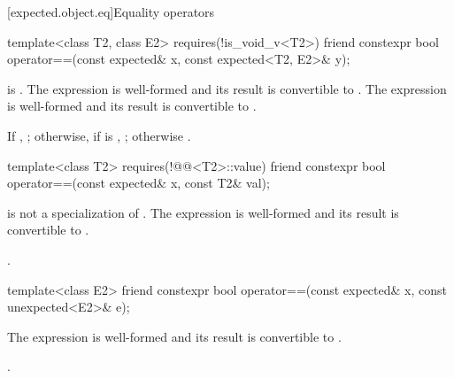 [expected.object.eq]{Equality operators}

%
\begin{itemdecl}
template<class T2, class E2>
  requires(!is_void_v<T2>)
friend constexpr bool operator==(const expected& x, const expected<T2, E2>& y);
\end{itemdecl}

\begin{itemdescr}
\pnum
\mandates
{} is . The expression  is well-formed and its result is convertible to . The expression  is well-formed and its result is convertible to .

\pnum
\returns
If , ; otherwise, if  is , ; otherwise .
\end{itemdescr}

%
\begin{itemdecl}
template<class T2>
  requires(!@@<T2>::value)
friend constexpr bool operator==(const expected& x, const T2& val);
\end{itemdecl}

\begin{itemdescr}
\pnum
\mandates
{} is not a specialization of . The expression  is well-formed and its result is convertible to .

\pnum
\returns
{}.
\end{itemdescr}

%
\begin{itemdecl}
template<class E2>
friend constexpr bool operator==(const expected& x, const unexpected<E2>& e);
\end{itemdecl}

\begin{itemdescr}
\pnum
\mandates
The expression  is well-formed and its result is convertible to .

\pnum
\returns
{}.
\end{itemdescr}
